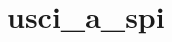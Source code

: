 \hypertarget{group__usci__a__spi__api}{}\section{usci\+\_\+a\+\_\+spi}
\label{group__usci__a__spi__api}
